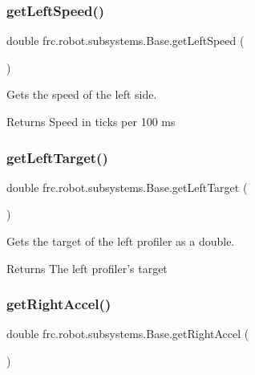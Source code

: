 \subsubsection{\texorpdfstring{getLeftSpeed()}{getLeftSpeed()}}
{\footnotesize\ttfamily double frc.\+robot.\+subsystems.\+Base.\+get\+Left\+Speed (\begin{DoxyParamCaption}{ }\end{DoxyParamCaption})\hspace{0.3cm}{\ttfamily [inline]}}



Gets the speed of the left side. 

\begin{DoxyReturn}{Returns}
Speed in ticks per 100 ms 
\end{DoxyReturn}
\mbox{\label{classfrc_1_1robot_1_1subsystems_1_1_base_aa2dadd553dfc8910c56d24900a52f91e}} 
\subsubsection{\texorpdfstring{getLeftTarget()}{getLeftTarget()}}
{\footnotesize\ttfamily double frc.\+robot.\+subsystems.\+Base.\+get\+Left\+Target (\begin{DoxyParamCaption}{ }\end{DoxyParamCaption})\hspace{0.3cm}{\ttfamily [inline]}}



Gets the target of the left profiler as a double. 

\begin{DoxyReturn}{Returns}
The left profiler’s target 
\end{DoxyReturn}
\mbox{\label{classfrc_1_1robot_1_1subsystems_1_1_base_a914de01840db6b8984e6594ff194ae00}} 
\subsubsection{\texorpdfstring{getRightAccel()}{getRightAccel()}}
{\footnotesize\ttfamily double frc.\+robot.\+subsystems.\+Base.\+get\+Right\+Accel (\begin{DoxyParamCaption}{ }\end{DoxyParamCaption})\hspace{0.3cm}{\ttfamily [inline]}}



